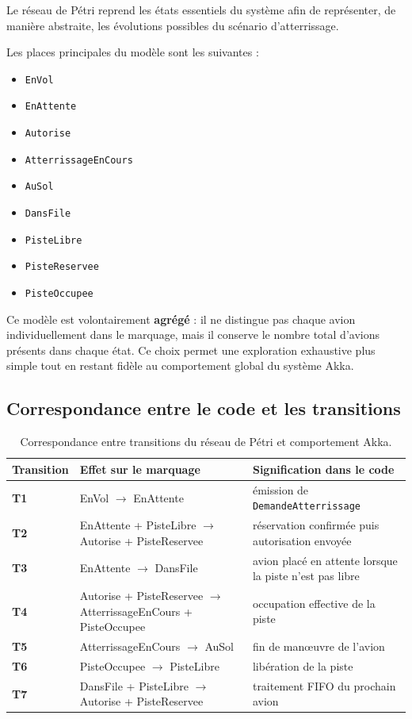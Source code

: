 \documentclass[11pt,a4paper]{article}
\begin{document}
Le réseau de Pétri reprend les états essentiels du système afin de représenter, de manière abstraite, les évolutions possibles du scénario d'atterrissage.

Les places principales du modèle sont les suivantes :
\begin{itemize}
    \item \texttt{EnVol}
    \item \texttt{EnAttente}
    \item \texttt{Autorise}
    \item \texttt{AtterrissageEnCours}
    \item \texttt{AuSol}
    \item \texttt{DansFile}
    \item \texttt{PisteLibre}
    \item \texttt{PisteReservee}
    \item \texttt{PisteOccupee}
\end{itemize}

Ce modèle est volontairement \textbf{agrégé} : il ne distingue pas chaque avion individuellement dans le marquage, mais il conserve le nombre total d'avions présents dans chaque état. Ce choix permet une exploration exhaustive plus simple tout en restant fidèle au comportement global du système Akka.

\subsection{Correspondance entre le code et les transitions}

\begin{table}[H]
\centering
\caption{Correspondance entre transitions du réseau de Pétri et comportement Akka.}
\begin{tabularx}{\textwidth}{>{\bfseries}p{2.2cm} p{4.2cm} Y}
\toprule
Transition & Effet sur le marquage & Signification dans le code \\
\midrule
T1 & EnVol $\rightarrow$ EnAttente & émission de \texttt{DemandeAtterrissage} \\
T2 & EnAttente + PisteLibre $\rightarrow$ Autorise + PisteReservee & réservation confirmée puis autorisation envoyée \\
T3 & EnAttente $\rightarrow$ DansFile & avion placé en attente lorsque la piste n'est pas libre \\
T4 & Autorise + PisteReservee $\rightarrow$ AtterrissageEnCours + PisteOccupee & occupation effective de la piste \\
T5 & AtterrissageEnCours $\rightarrow$ AuSol & fin de manœuvre de l'avion \\
T6 & PisteOccupee $\rightarrow$ PisteLibre & libération de la piste \\
T7 & DansFile + PisteLibre $\rightarrow$ Autorise + PisteReservee & traitement FIFO du prochain avion \\
\bottomrule
\end{tabularx}
\end{table}
\end{document}
